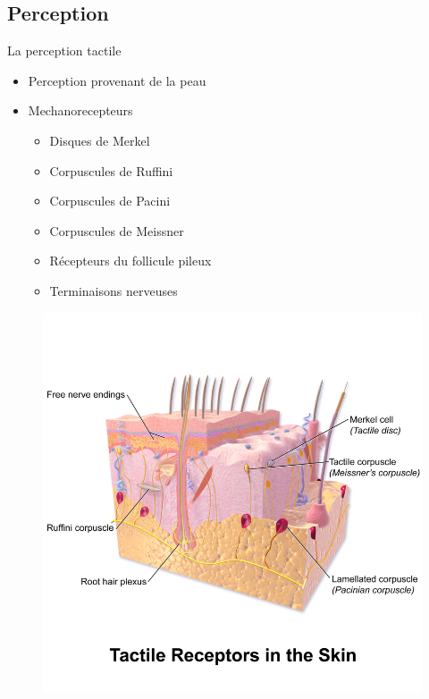 \documentclass[compress, noflama]{beamer}
\begin{document}
\subsection{Perception}
{
\begin{frame}{La perception tactile}
\begin{itemize}
\item Perception provenant de la peau
\end{itemize}
\begin{multicols}{2}
\begin{itemize}
\item Mechanorecepteurs
\begin{itemize}
\item Disques de Merkel
\item Corpuscules de Ruffini
\item Corpuscules de Pacini
\item Corpuscules de Meissner
\item Récepteurs du follicule pileux
\item Terminaisons nerveuses
\end{itemize}
\end{itemize}

\begin{figure}
\centering
\includegraphics[width=\linewidth]{images/tactileReceptors}
\end{figure}
\end{multicols}
\end{frame}
}
\end{document}

